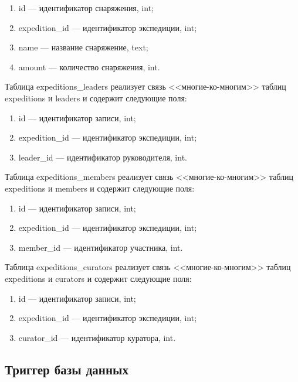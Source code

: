 \begin{enumerate}[left=0.49cm, label=\arabic*.]
        \item id --- идентификатор снаряжения, int;
	\item expedition\_id --- идентификатор экспедиции, int;
	\item name --- название снаряжение, text;
        \item amount --- количество снаряжения, int.
\end{enumerate}

Таблица expeditions\_leaders реализует связь <<многие-ко-многим>> таблиц expeditions и leaders и содержит следующие поля:

\begin{enumerate}[left=0.49cm, label=\arabic*.]
        \item id --- идентификатор записи, int;
        \item expedition\_id --- идентификатор экспедиции, int;
        \item leader\_id --- идентификатор руководителя, int.
\end{enumerate}

Таблица expeditions\_members реализует связь <<многие-ко-многим>> таблиц expeditions и members и содержит следующие поля:

\begin{enumerate}[left=0.49cm, label=\arabic*.]
        \item id --- идентификатор записи, int;
        \item expedition\_id --- идентификатор экспедиции, int;
        \item member\_id --- идентификатор участника, int.
\end{enumerate}

Таблица expeditions\_curators реализует связь <<многие-ко-многим>> таблиц expeditions и curators и содержит следующие поля:

\begin{enumerate}[left=0.49cm, label=\arabic*.]
        \item id --- идентификатор записи, int;
        \item expedition\_id --- идентификатор экспедиции, int;
        \item curator\_id --- идентификатор куратора, int.
\end{enumerate}



\subsection{Триггер базы данных}

